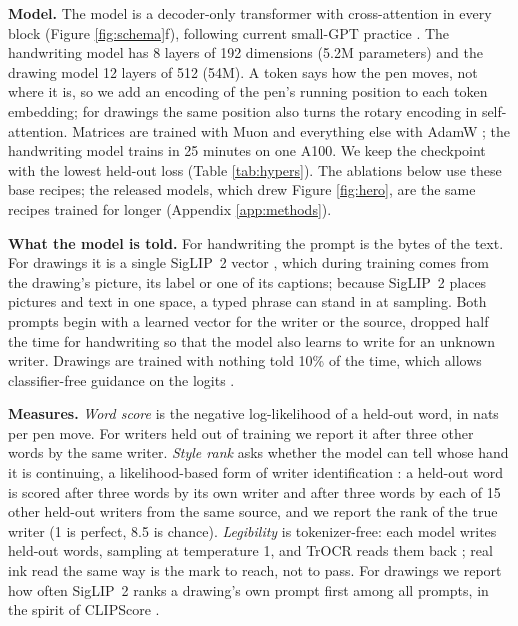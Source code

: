\documentclass{article}
\begin{document}
\textbf{Model.} The model is a decoder-only transformer \citep{vaswani2017attention} with cross-attention in every block (Figure \ref{fig:schema}f), following current small-GPT practice \citep{karpathy2022nanogpt,jordan2024modded,su2021roformer,so2021primer}. The handwriting model has 8 layers of 192 dimensions (5.2M parameters) and the drawing model 12 layers of 512 (54M). A token says how the pen moves, not where it is, so we add an encoding of the pen's running position to each token embedding; for drawings the same position also turns the rotary encoding in self-attention. Matrices are trained with Muon \citep{jordan2024muon} and everything else with AdamW \citep{loshchilov2019decoupled}; the handwriting model trains in 25 minutes on one A100. We keep the checkpoint with the lowest held-out loss (Table \ref{tab:hypers}). The ablations below use these base recipes; the released models, which drew Figure \ref{fig:hero}, are the same recipes trained for longer (Appendix \ref{app:methods}).

\textbf{What the model is told.} For handwriting the prompt is the bytes of the text. For drawings it is a single SigLIP~2 vector \citep{tschannen2025siglip2}, which during training comes from the drawing's picture, its label or one of its captions; because SigLIP~2 places pictures and text in one space, a typed phrase can stand in at sampling. Both prompts begin with a learned vector for the writer or the source, dropped half the time for handwriting so that the model also learns to write for an unknown writer. Drawings are trained with nothing told 10\% of the time, which allows classifier-free guidance on the logits \citep{ho2022classifier,sanchez2024stay}.

\textbf{Measures.} \emph{Word score} is the negative log-likelihood of a held-out word, in nats per pen move. For writers held out of training we report it after three other words by the same writer. \emph{Style rank} asks whether the model can tell whose hand it is continuing, a likelihood-based form of writer identification \citep{bulacu2007text}: a held-out word is scored after three words by its own writer and after three words by each of 15 other held-out writers from the same source, and we report the rank of the true writer (1 is perfect, 8.5 is chance). \emph{Legibility} is tokenizer-free: each model writes held-out words, sampling at temperature 1, and TrOCR \citep{li2021trocr} reads them back \citep{afonin2023sampling}; real ink read the same way is the mark to reach, not to pass. For drawings we report how often SigLIP~2 ranks a drawing's own prompt first among all prompts, in the spirit of CLIPScore \citep{hessel2021clipscore}.
\end{document}
